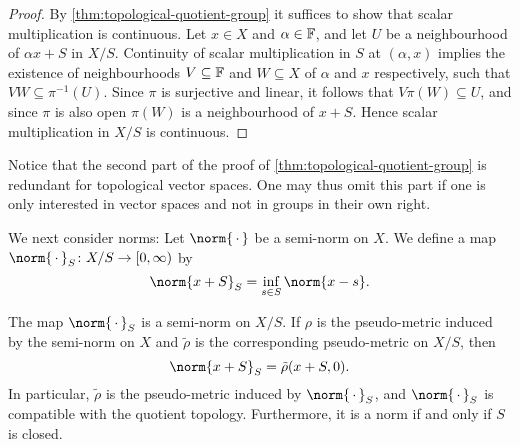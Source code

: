 \documentclass[article, a4paper, 11pt, oneside]{memoir}
\numberwithin{equation}{chapter}
\newcommand{\preim}{^{-1}}
\begin{document}
\begin{proof}
    By \cref{thm:topological-quotient-group} it suffices to show that scalar multiplication is continuous. Let $x \in X$ and $\alpha \in \mathbb{F}$, and let $U$ be a neighbourhood of $\alpha x + S$ in $X/S$. Continuity of scalar multiplication in $S$ at $(\alpha, x)$ implies the existence of neighbourhoods $V \subseteq \mathbb{F}$ and $W \subseteq X$ of $\alpha$ and $x$ respectively, such that $VW \subseteq \pi\preim(U)$. Since $\pi$ is surjective and linear, it follows that $V \pi(W) \subseteq U$, and since $\pi$ is also open $\pi(W)$ is a neighbourhood of $x + S$. Hence scalar multiplication in $X/S$ is continuous.
\end{proof}
%
Notice that the second part of the proof of \cref{thm:topological-quotient-group} is redundant for topological vector spaces. One may thus omit this part if one is only interested in vector spaces and not in groups in their own right.



We next consider norms: Let $\norm{\,\cdot\,}$ be a semi-norm on $X$. We define a map $\norm{\,\cdot\,}_S \colon X/S \to [0, \infty)$ by
%
\begin{equation*}
    \norm{x + S}_S
        = \inf_{s \in S} \norm{x - s}.
\end{equation*}

\begin{proposition}
    The map $\norm{\,\cdot\,}_S$ is a semi-norm on $X/S$. If $\rho$ is the pseudo-metric induced by the semi-norm on $X$ and $\tilde{\rho}$ is the corresponding pseudo-metric on $X/S$, then
    \begin{equation*}
        \norm{x + S}_S = \tilde{\rho}(x + S, 0).
    \end{equation*}
    In particular, $\tilde{\rho}$ is the pseudo-metric induced by $\norm{\,\cdot\,}_S$, and $\norm{\,\cdot\,}_S$ is compatible with the quotient topology. Furthermore, it is a norm if and only if $S$ is closed.
\end{proposition}
\end{document}
